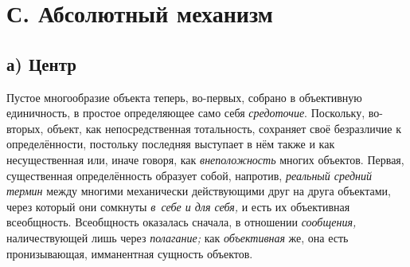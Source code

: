 \section[С. Абсолютный механизм]{С. Абсолютный механизм}

\subsection[а) Центр]{а) Центр}

Пустое многообразие объекта теперь, во-первых, собрано в
объективную единичность, в простое определяющее само себя
{\em средоточие}.
Поскольку, во-вторых, объект, как непосредственная
тотальность, сохраняет своё безразличие к определённости, постольку
последняя выступает в нём также и как несущественная или, иначе говоря, как
{\em внеположность}
многих объектов. Первая, существенная определённость образует
собой, напротив, {\em реальный средний
термин} между многими механически действующими друг на друга
объектами, через который они сомкнуты
{\em в~себе и для себя,}
и есть их объективная всеобщность. Всеобщность оказалась
сначала, в отношении {\em сообщения,}
наличествующей лишь через
{\em полагание;} как
{\em объективная} же, она
есть пронизывающая, имманентная сущность объектов.

